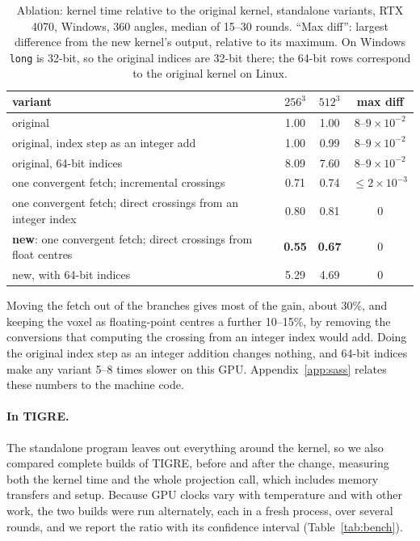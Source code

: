 \documentclass[11pt,a4paper]{article}
\theoremstyle{remark}
\begin{document}
\begin{table}[h]
\centering
\caption{\label{tab:variants}Ablation: kernel time relative to the original kernel, standalone variants,
RTX 4070, Windows, 360 angles, median of 15--30 rounds. ``Max diff'': largest difference from the new
kernel's output, relative to its maximum. On Windows \texttt{long} is 32-bit, so the original indices are
32-bit there; the 64-bit rows correspond to the original kernel on Linux.}
\begin{tabular}{lccc}
\toprule
variant & $256^3$ & $512^3$ & max diff \\
\midrule
original                                                          & 1.00 & 1.00 & $8$--$9\times10^{-2}$\\
original, index step as an integer add                            & 1.00 & 0.99 & $8$--$9\times10^{-2}$\\
original, 64-bit indices                                          & 8.09 & 7.60 & $8$--$9\times10^{-2}$\\
one convergent fetch; incremental crossings                       & 0.71 & 0.74 & $\le2\times10^{-3}$\\
one convergent fetch; direct crossings from an integer index      & 0.80 & 0.81 & 0\\
\textbf{new}: one convergent fetch; direct crossings from float centres & \textbf{0.55} & \textbf{0.67} & 0\\
new, with 64-bit indices                                          & 5.29 & 4.69 & 0\\
\bottomrule
\end{tabular}
\end{table}

Moving the fetch out of the branches gives most of the gain, about 30\%, and keeping the voxel as
floating-point centres a further 10--15\%, by removing the conversions that computing the crossing from an
integer index would add. Doing the original index step as an integer addition changes nothing, and 64-bit
indices make any variant 5--8 times slower on this GPU. Appendix~\ref{app:sass} relates these numbers to the
machine code.

\paragraph{In TIGRE.} The standalone program leaves out everything around the kernel, so we also compared
complete builds of TIGRE, before and after the change, measuring both the kernel time and the whole
projection call, which includes memory transfers and setup. Because GPU clocks vary with temperature and
with other work, the two builds were run alternately, each in a fresh process, over several rounds, and we
report the ratio with its confidence interval (Table~\ref{tab:bench}).
\end{document}
